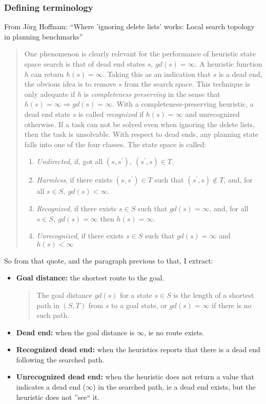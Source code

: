 \documentclass[a4paper, 11pt]{article}
\begin{document}
\subsubsection{Defining terminology}
From Jörg Hoffnam: ``Where 'ignoring delete lists' works: Local search topology in planning benchmarks'' 
\begin{quote}
    One phenomenon is clearly relevant for the performance of heuristic state space search is that of dead end states $s$, $gd(s) = \infty$. A heuristic function $h$ can return $h(s)=\infty$. Taking this as an indication that $s$ is a dead end, the obvious idea is to remove $s$ from the search space. This technique is only adequate if $h$ is \textit{completeness preserving} in the sense that $h(s)=\infty \Rightarrow gd(s) = \infty$. With a completeness-preserving heuristic, a dead end state $s$ is called \textit{recognized} if $h(s)=\infty$ and unrecognized otherwise. If a task can not be solved even when ignoring the delete lists, then the task is unsolvable. With respect to dead ends, any planning state falls into one of the four classes. The state space is called:
    \begin{enumerate}
        \item \textit{Undirected}, if, got all $(s,s^\prime), ~ (s^\prime, s)\in T$.
        \item \textit{Harmless}, if there exists $(s,s^\prime)\in T$ such that $(s^\prime,s)\notin T$, and, for all $s\in S,  ~ gd(s) < \infty$.
        \item \textit{Recognized}, if there exists $s\in S$ such that $gd(s) = \infty$, and, for all $s\in S, ~ gd(s) = \infty$ then $h(s)=\infty$.
        \item \textit{Unrecognized}, if there exists $s\in S$ such that $gd(s) = \infty$ and $h(s) < \infty$
    \end{enumerate}
    \end{quote}

So from that quote, and the paragraph previous to that, I extract: 

\begin{itemize}
    \item \textbf{Goal distance:} the shortest route to the goal.
    \begin{quote}{The goal distance $gd(s)$ for a state $s \in S$ is the length of a shortest path in $(S, T)$ from $s$ to a goal state, or $gd(s) = \infty$ if there is no such path.}
        \end{quote}
    \item \textbf{Dead end:} when the goal distance is $\infty$, ie no route exists.
    \item \textbf{Recognized dead end:} when the heuristics reports that there is a dead end following the searched path.
    \item \textbf{Unrecognized dead end:} when the heuristic does not return a value that indicates a dead end ($\infty$) in the searched path, ie a dead end exists, but the heuristic does not ''see`` it.
\end{itemize}
\end{document}
